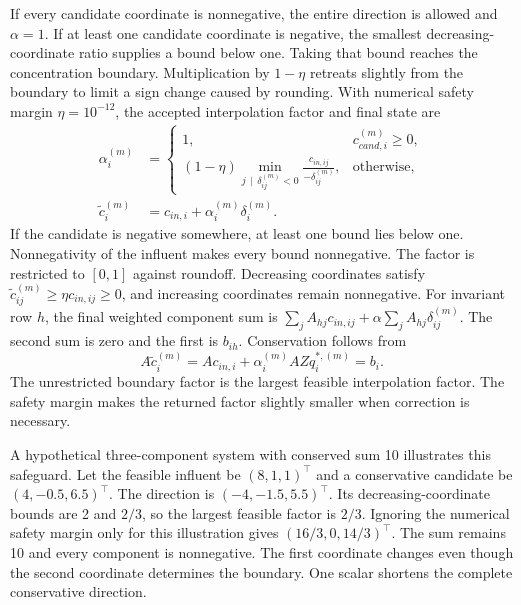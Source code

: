 If every candidate coordinate is nonnegative, the entire direction is allowed and $\alpha=1$. If at least one candidate coordinate is negative, the smallest decreasing-coordinate ratio supplies a bound below one. Taking that bound reaches the concentration boundary. Multiplication by $1-\eta$ retreats slightly from the boundary to limit a sign change caused by rounding. With numerical safety margin $\eta=10^{-12}$, the accepted interpolation factor and final state are
\begin{equation}
\begin{split}
\alpha_i^{(m)}&=
\begin{cases}
1, & c_{cand,i}^{(m)}\geq0,\\
(1-\eta)\displaystyle\min_{j\,\mid\,\delta_{ij}^{(m)}<0}
\frac{c_{in,ij}}{-\delta_{ij}^{(m)}}, & \text{otherwise},
\end{cases}\\
\tilde c_i^{(m)}&=c_{in,i}+\alpha_i^{(m)}\delta_i^{(m)}.
\end{split}
\label{eq:projection_positivity_backtracking}
\end{equation}
If the candidate is negative somewhere, at least one bound lies below one. Nonnegativity of the influent makes every bound nonnegative. The factor is restricted to $[0,1]$ against roundoff. Decreasing coordinates satisfy $\tilde c_{ij}^{(m)}\geq\eta c_{in,ij}\geq0$, and increasing coordinates remain nonnegative. For invariant row $h$, the final weighted component sum is $\sum_jA_{hj}c_{in,ij}+\alpha\sum_jA_{hj}\delta_{ij}^{(m)}$. The second sum is zero and the first is $b_{ih}$. Conservation follows from
\begin{equation}
A\tilde c_i^{(m)}=Ac_{in,i}+\alpha_i^{(m)}AZq_i^{*,(m)}=b_i.
\label{eq:projection_final_conservation}
\end{equation}
The unrestricted boundary factor is the largest feasible interpolation factor. The safety margin makes the returned factor slightly smaller when correction is necessary.

A hypothetical three-component system with conserved sum 10 illustrates this safeguard. Let the feasible influent be $(8,1,1)^\top$ and a conservative candidate be $(4,-0.5,6.5)^\top$. The direction is $(-4,-1.5,5.5)^\top$. Its decreasing-coordinate bounds are 2 and $2/3$, so the largest feasible factor is $2/3$. Ignoring the numerical safety margin only for this illustration gives $(16/3,0,14/3)^\top$. The sum remains 10 and every component is nonnegative. The first coordinate changes even though the second coordinate determines the boundary. One scalar shortens the complete conservative direction.

